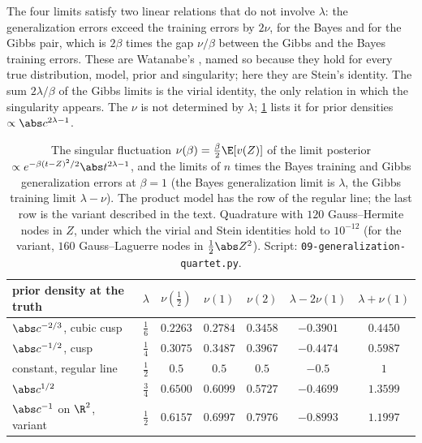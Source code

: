 \begin{refsection}
The four limits satisfy two linear relations that do not involve $\lambda$: the generalization errors exceed the training errors by $2\nu$, for the Bayes and for the Gibbs pair, which is $2\beta$ times the gap $\nu/\beta$ between the Gibbs and the Bayes training errors. These are Watanabe's , named so because they hold for every true distribution, model, prior and singularity; here they are Stein's identity. The sum $2\lambda/\beta$ of the Gibbs limits is the virial identity, the only relation in which the singularity appears. The  $\nu$ is not determined by $\lambda$; \cref{tab:generalization:nu} lists it for prior densities $\propto\abs c^{2\lambda-1}$.

\begin{table}[t]
\centering
\small
\setlength{\tabcolsep}{5pt}
\begin{tabular}{@{}lcccccc@{}}
\toprule
prior density at the truth & $\lambda$ & $\nu(\frac12)$ & $\nu(1)$ & $\nu(2)$ & $\lambda-2\nu(1)$ & $\lambda+\nu(1)$\\
\midrule
$\abs c^{-2/3}$, cubic cusp & $\frac16$ & $0.2263$ & $0.2784$ & $0.3458$ & $-0.3901$ & $0.4450$\\
$\abs c^{-1/2}$, cusp & $\frac14$ & $0.3075$ & $0.3487$ & $0.3967$ & $-0.4474$ & $0.5987$\\
constant, regular line & $\frac12$ & $0.5$ & $0.5$ & $0.5$ & $-0.5$ & $1$\\
$\abs c^{1/2}$ & $\frac34$ & $0.6500$ & $0.6099$ & $0.5727$ & $-0.4699$ & $1.3599$\\
$\abs c^{-1}$ on $\R^2$, variant & $\frac12$ & $0.6157$ & $0.6997$ & $0.7976$ & $-0.8993$ & $1.1997$\\
\bottomrule
\end{tabular}
\caption{The singular fluctuation $\nu(\beta)=\frac\beta2\E[v(Z)]$ of the limit posterior $\propto e^{-\beta(t-Z)^2/2}\abs t^{2\lambda-1}$, and the limits of $n$ times the Bayes training and Gibbs generalization errors at $\beta=1$ (the Bayes generalization limit is $\lambda$, the Gibbs training limit $\lambda-\nu$). The product model has the row of the regular line; the last row is the variant described in the text. Quadrature with $120$ Gauss--Hermite nodes in $Z$, under which the virial and Stein identities hold to $10^{-12}$ (for the variant, $160$ Gauss--Laguerre nodes in $\frac12\abs Z^2$). Script: \texttt{09-generalization-quartet.py}.}\label{tab:generalization:nu}
\end{table}


\end{refsection}
